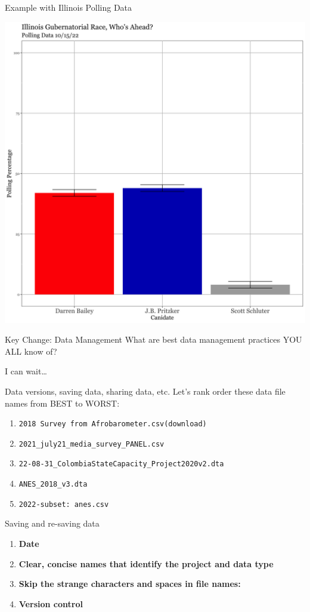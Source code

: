 \documentclass[
  ignorenonframetext,
]{beamer}
\begin{document}
\begin{frame}{Example with Illinois Polling Data}
\protect\hypertarget{example-with-illinois-polling-data}{}
\centering

\includegraphics[width=0.65\linewidth]{illinois_recent_poll}
\end{frame}

\begin{frame}{Key Change: Data Management}
\protect\hypertarget{key-change-data-management}{}
What are best data management practices YOU ALL know of?

I can wait\ldots{}
\end{frame}

\begin{frame}[fragile]{Data versions, saving data, sharing data, etc.}
\protect\hypertarget{data-versions-saving-data-sharing-data-etc.}{}
Let's rank order these data file names from BEST to WORST:

\begin{enumerate}
\item
  \texttt{2018\ Survey\ from\ Afrobarometer.csv(download)}
\item
  \texttt{2021\_july21\_media\_survey\_PANEL.csv}
\item
  \texttt{22-08-31\_ColombiaStateCapacity\_Project2020v2.dta}
\item
  \texttt{ANES\_2018\_v3.dta}
\item
  \texttt{2022-subset:\ anes.csv}
\end{enumerate}
\end{frame}

\begin{frame}{Saving and re-saving data}
\protect\hypertarget{saving-and-re-saving-data}{}
\begin{enumerate}
\item
  \textbf{Date}
\item
  \textbf{Clear, concise names that identify the project and data type}
\item
  \textbf{Skip the strange characters and spaces in file names:}
\item
  \textbf{Version control}
\end{enumerate}
\end{frame}
\end{document}
